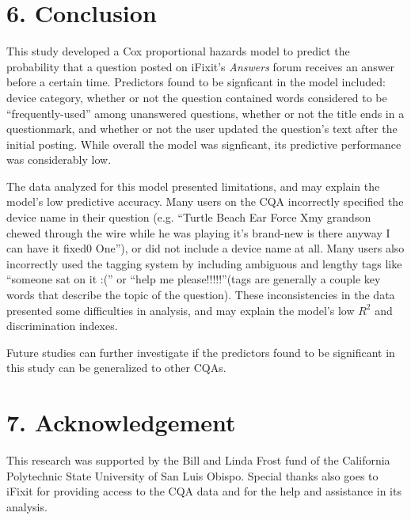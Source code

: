 \documentclass{article}
\begin{document}


\section*{6. Conclusion}

This study developed a Cox proportional hazards model to predict the probability that a question posted on iFixit's \textit{Answers} forum receives an answer before a certain time. Predictors found to be signficant in the model included: device category, whether or not the question contained words considered to be ``frequently-used'' among unanswered questions, whether or not the title ends in a questionmark, and whether or not the user updated the question's text after the initial posting. While overall the model was signficant, its predictive performance was considerably low. 

The data analyzed for this model presented limitations, and may explain the model's low predictive accuracy. Many users on the CQA incorrectly specified the device name in their question (e.g. ``Turtle Beach Ear Force Xmy grandson chewed through the wire while he was playing it's brand-new is there anyway I can have it fixed0 One''), or did not include a device name at all. Many users also incorrectly used the tagging system by including ambiguous and lengthy tags like ``someone sat on it :('' or ``help me please!!!!!''(tags are generally a couple key words that describe the topic of the question). These inconsistencies in the data presented some difficulties in analysis, and may explain the model's low $R^2$ and discrimination indexes. 

Future studies can further investigate if the predictors found to be significant in this study can be generalized to other CQAs. 




\section*{7. Acknowledgement}

This research was supported by the Bill and Linda Frost fund of the California Polytechnic State University of San Luis Obispo. Special thanks also goes to iFixit for providing access to the CQA data and for the help and assistance in its analysis. 
\end{document}
